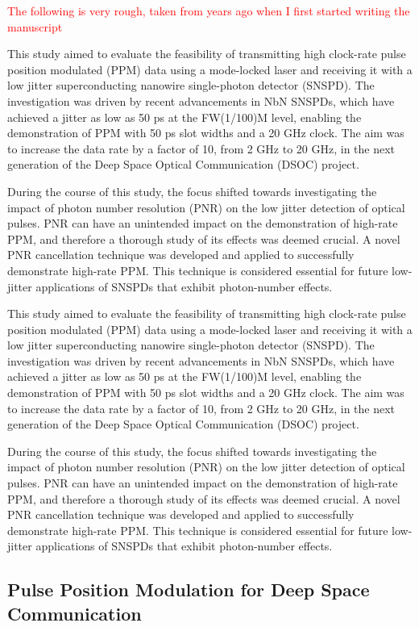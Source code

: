 \documentclass{optica-article}
\begin{document}
\textcolor{red}{ The following is very rough, taken from years ago when I first started writing the manuscript }

This study aimed to evaluate the feasibility of transmitting high clock-rate pulse position modulated (PPM) data using a mode-locked laser and receiving it with a low jitter superconducting nanowire single-photon detector (SNSPD). The investigation was driven by recent advancements in NbN SNSPDs, which have achieved a jitter as low as 50 ps at the FW(1/100)M level, enabling the demonstration of PPM with 50 ps slot widths and a 20 GHz clock. The aim was to increase the data rate by a factor of 10, from 2 GHz to 20 GHz, in the next generation of the Deep Space Optical Communication (DSOC) project.

During the course of this study, the focus shifted towards investigating the impact of photon number resolution (PNR) on the low jitter detection of optical pulses. PNR can have an unintended impact on the demonstration of high-rate PPM, and therefore a thorough study of its effects was deemed crucial. A novel PNR cancellation technique was developed and applied to successfully demonstrate high-rate PPM. This technique is considered essential for future low-jitter applications of SNSPDs that exhibit photon-number effects.

This study aimed to evaluate the feasibility of transmitting high clock-rate pulse position modulated (PPM) data using a mode-locked laser and receiving it with a low jitter superconducting nanowire single-photon detector (SNSPD). The investigation was driven by recent advancements in NbN SNSPDs, which have achieved a jitter as low as 50 ps at the FW(1/100)M level, enabling the demonstration of PPM with 50 ps slot widths and a 20 GHz clock. The aim was to increase the data rate by a factor of 10, from 2 GHz to 20 GHz, in the next generation of the Deep Space Optical Communication (DSOC) project.

During the course of this study, the focus shifted towards investigating the impact of photon number resolution (PNR) on the low jitter detection of optical pulses. PNR can have an unintended impact on the demonstration of high-rate PPM, and therefore a thorough study of its effects was deemed crucial. A novel PNR cancellation technique was developed and applied to successfully demonstrate high-rate PPM. This technique is considered essential for future low-jitter applications of SNSPDs that exhibit photon-number effects.

\hypertarget{pulse-position-modulation-for-deep-space-communication}{%
\subsection{Pulse Position Modulation for Deep Space Communication}\label{pulse-position-modulation-for-deep-space-communication}}
\end{document}
